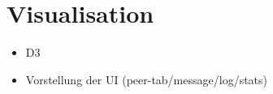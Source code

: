 \section{Visualisation}
\begin{itemize}
    \item D3
    \item Vorstellung der UI (peer-tab/message/log/stats)
\end{itemize}